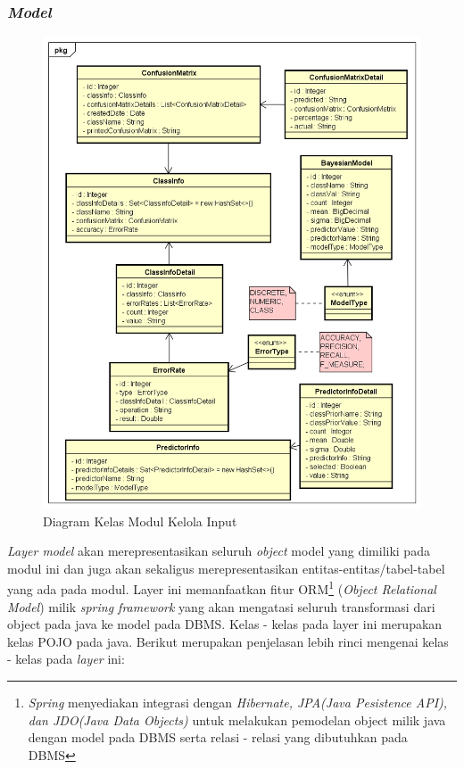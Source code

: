 \subsubsection{\textit{Model}}
\begin{figure}[H]
	\centering
	\includegraphics[scale=0.6]{ClassDiagramLengkap/Klasifikasi/Simple_CD_Klasifikasi_Model}
	\caption[Diagram Kelas Modul Kelola Input]{Diagram Kelas Modul Kelola Input}
	\label{fig:Diagram Kelas Modul Kelola Input}
\end{figure}

\textit{Layer model} akan merepresentasikan seluruh \textit{object} model yang dimiliki pada modul ini dan juga akan sekaligus merepresentasikan entitas-entitas/tabel-tabel yang ada pada modul. Layer ini memanfaatkan fitur ORM\footnote{\textit{Spring} menyediakan integrasi dengan \textit{Hibernate, JPA(Java Pesistence API), dan JDO(Java Data Objects)} untuk melakukan pemodelan object milik java dengan model pada DBMS serta relasi - relasi yang dibutuhkan pada DBMS} (\textit{Object Relational Model}) milik \textit{spring framework} yang akan mengatasi seluruh transformasi dari object pada java ke model pada DBMS. Kelas - kelas pada layer ini merupakan kelas POJO pada java. Berikut merupakan penjelasan lebih rinci mengenai kelas - kelas pada \textit{layer} ini:


